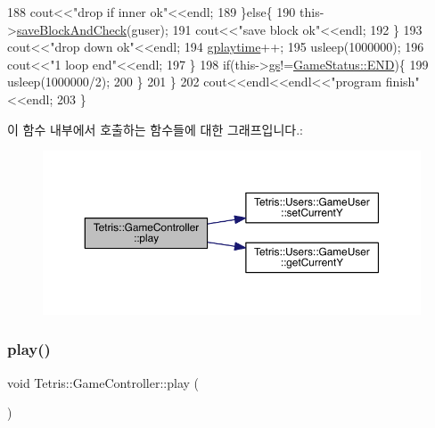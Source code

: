 \begin{DoxyCode}
188                             cout<<\textcolor{stringliteral}{"drop if inner ok"}<<endl;
189                         \}\textcolor{keywordflow}{else}\{
190                             this->\hyperlink{class_tetris_1_1_game_controller_a3c63a9754e4cbeae4f66a5760bb4055d}{saveBlockAndCheck}(guser);
191                             cout<<\textcolor{stringliteral}{"save block ok"}<<endl;
192                         \}
193                         cout<<\textcolor{stringliteral}{"drop down ok"}<<endl;
194                         \hyperlink{class_tetris_1_1_game_controller_a562adcade20e362160535cd7248a2cce}{gplaytime}++;
195                         usleep(1000000);
196                         cout<<\textcolor{stringliteral}{"1 loop end"}<<endl;
197                     \}
198                     \textcolor{keywordflow}{if}(this->\hyperlink{class_tetris_1_1_game_controller_ae4c894005a82404c73a5a9a6efb208dc}{gs}!=\hyperlink{class_tetris_1_1_game_controller_a96a963b56385f3b3a122ff0ca2beb770ab1a326c06d88bf042f73d70f50197905}{GameStatus::END})\{
199                         usleep(1000000/2);
200                     \}
201                 \}
202                 cout<<endl<<endl<<\textcolor{stringliteral}{"program finish"}<<endl;
203             \}
\end{DoxyCode}
이 함수 내부에서 호출하는 함수들에 대한 그래프입니다.\+:
\nopagebreak
\begin{figure}[H]
\begin{center}
\leavevmode
\includegraphics[width=350pt]{db/dd2/class_tetris_1_1_game_controller_a766a7537d955c62969f2e4b7c0b3c73d_cgraph}
\end{center}
\end{figure}
\mbox{\label{class_tetris_1_1_game_controller_a766a7537d955c62969f2e4b7c0b3c73d}} 
\subsubsection{\texorpdfstring{play()}{play()}\hspace{0.1cm}{\footnotesize\ttfamily [2/2]}}
{\footnotesize\ttfamily void Tetris\+::\+Game\+Controller\+::play (\begin{DoxyParamCaption}{ }\end{DoxyParamCaption})\hspace{0.3cm}{\ttfamily [inline]}}



